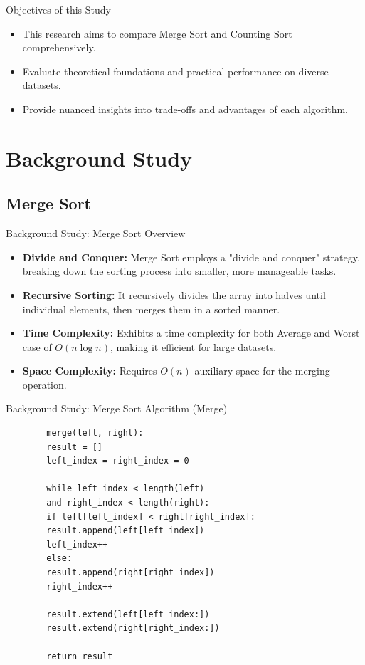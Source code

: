 \documentclass{beamer}
\begin{document}
	\begin{frame}{Objectives of this Study}
		\begin{itemize}
			\item This research aims to compare Merge Sort and Counting Sort comprehensively.
			
			\item Evaluate theoretical foundations and practical performance on diverse datasets.
			
			\item Provide nuanced insights into trade-offs and advantages of each algorithm.
		\end{itemize}
	\end{frame}
\section{Background Study}

\subsection{Merge Sort}

\begin{frame}{Background Study: Merge Sort Overview}
	\begin{itemize}
		\item \textbf{Divide and Conquer:} Merge Sort employs a "divide and conquer" strategy, breaking down the sorting process into smaller, more manageable tasks.
		\item \textbf{Recursive Sorting:} It recursively divides the array into halves until individual elements, then merges them in a sorted manner.
		\item \textbf{Time Complexity:} Exhibits a time complexity for both Average and Worst case of $O(n \log n)$, making it efficient for large datasets.
		\item \textbf{Space Complexity:} Requires $O(n)$ auxiliary space for the merging operation.
	\end{itemize}
\end{frame}

\begin{frame}[fragile]{Background Study: Merge Sort Algorithm (Merge)}
	\begin{verbatim}
		merge(left, right):
		result = []
		left_index = right_index = 0
		
		while left_index < length(left) 
		and right_index < length(right):
		if left[left_index] < right[right_index]:
		result.append(left[left_index])
		left_index++
		else:
		result.append(right[right_index])
		right_index++
		
		result.extend(left[left_index:])
		result.extend(right[right_index:])
		
		return result
	\end{verbatim}
\end{frame}
\end{document}
